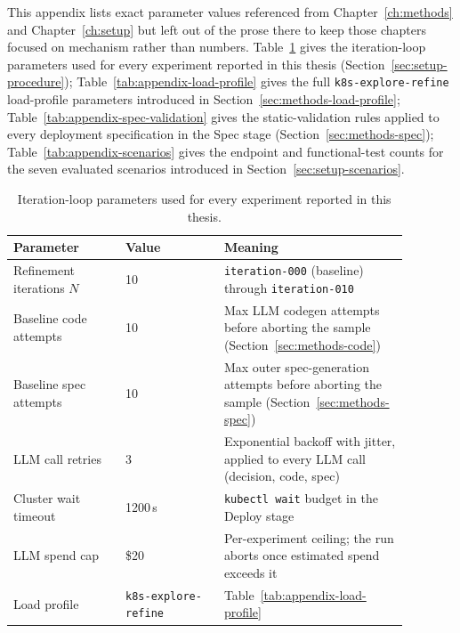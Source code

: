\label{ch:appendix-config}

This appendix lists exact parameter values referenced from
Chapter~\ref{ch:methods} and Chapter~\ref{ch:setup} but left out of the
prose there to keep those chapters focused on mechanism rather than
numbers. Table~\ref{tab:appendix-loop-params} gives the iteration-loop
parameters used for every experiment reported in this thesis
(Section~\ref{sec:setup-procedure}); Table~\ref{tab:appendix-load-profile}
gives the full \texttt{k8s-explore-refine} load-profile parameters
introduced in Section~\ref{sec:methods-load-profile};
Table~\ref{tab:appendix-spec-validation} gives the static-validation rules
applied to every deployment specification in the Spec stage
(Section~\ref{sec:methods-spec});
Table~\ref{tab:appendix-scenarios} gives the endpoint and functional-test
counts for the seven evaluated scenarios introduced in
Section~\ref{sec:setup-scenarios}.

\begin{table}[htbp]
  \centering
  \caption{Iteration-loop parameters used for every experiment reported in
    this thesis.}
  \label{tab:appendix-loop-params}
  \small
  \begin{tabular}{@{}p{0.25\linewidth}p{0.22\linewidth}p{0.41\linewidth}@{}}
    \toprule
    \textbf{Parameter} & \textbf{Value} & \textbf{Meaning} \\
    \midrule
    Refinement iterations $N$ &
      10 &
      \texttt{iteration-000} (baseline) through \texttt{iteration-010} \\
    Baseline code attempts &
      10 &
      Max LLM codegen attempts before aborting the sample
      (Section~\ref{sec:methods-code}) \\
    Baseline spec attempts &
      10 &
      Max outer spec-generation attempts before aborting the sample
      (Section~\ref{sec:methods-spec}) \\
    LLM call retries &
      3 &
      Exponential backoff with jitter, applied to every LLM call (decision,
      code, spec) \\
    Cluster wait timeout &
      1200\,s &
      \texttt{kubectl wait} budget in the Deploy stage \\
    LLM spend cap &
      \$20 &
      Per-experiment ceiling; the run aborts once estimated spend exceeds
      it \\
    Load profile &
      \texttt{k8s-\allowbreak explore-\allowbreak refine} &
      Table~\ref{tab:appendix-load-profile} \\
    \bottomrule
  \end{tabular}
\end{table}

